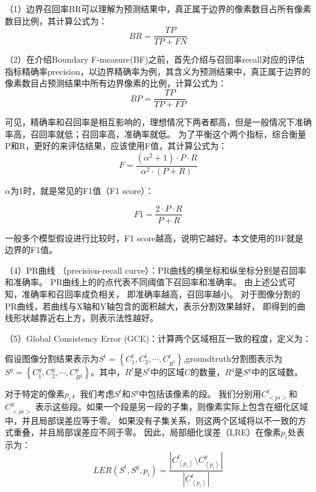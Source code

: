 （1）边界召回率BR可以理解为预测结果中，真正属于边界的像素数目占所有像素数目比例，其计算公式为：
\begin{equation}
BR = \frac{TP}{TP+FN}
\end{equation}

（2）在介绍Boundary F-measure(BF)之前，首先介绍与召回率recall对应的评估指标精确率precision，以边界精确率为例，其含义为预测结果中，真正属于边界的像素数目占预测结果中所有边界像素的比例，计算公式为：
\begin{equation}
BP = \frac{TP}{TP+FP}
\end{equation}

可见，精确率和召回率是相互影响的，理想情况下两者都高，但是一般情况下准确率高，召回率就低；召回率高，准确率就低。
为了平衡这个两个指标，综合衡量P和R，更好的来评估结果，应该使用F值，其计算公式为：
\begin{equation}
F=\frac{(\alpha^{2}+1)\cdot P\cdot R }{\alpha^{2}\cdot(P+R)}
\end{equation}

$\alpha$为1时，就是常见的F1值（F1 score）：

\begin{equation}
F1=\frac{2 \cdot P\cdot R }{P+R}
\end{equation}

一般多个模型假设进行比较时，F1 score越高，说明它越好。本文使用的BF就是边界的F1值。

（4）PR曲线 （precision-recall curve）：PR曲线的横坐标和纵坐标分别是召回率和准确率。
PR曲线上的的点代表不同阈值下召回率和准确率。
由上述公式可知，准确率和召回率成负相关， 即准确率越高，召回率越小。
对于图像分割的PR曲线，若曲线与X轴和Y轴包含的面积越大，表示分割效果越好，
即得到的曲线形状越靠近右上方，则表示法性越好。

（5）Global Consistency Error (GCE)：计算两个区域相互一致的程度，定义为：

假设图像分割结果表示为$S^{t} = \left \{ C_{1}^{t},C_{2}^{t},\cdots ,C_{R^{t}}^{t} \right \}$,groundtruth分割图表示为
$S^{g} = \left \{ C_{1}^{g},C_{2}^{g},\cdots ,C_{R^{g}}^{g} \right \}$。其中，$R^{t}$是$S^{t}$中的区域$C$的数量，$R^{g}$是$S^{g}$中的区域数。

对于特定的像素$p_{i}$，我们考虑$S^{t}$和$S^{g}$中包括该像素的段。 我们分别用$C_{<pi>}^{t}$和$C_{<pi>}^{g}$ 表示这些段。如果一个段是另一段的子集，则像素实际上包含在细化区域中，并且局部误差应等于零。 如果没有子集关系，则这两个区域将以不一致的方式重叠，并且局部误差应不同于零。 因此，局部细化误差（LRE）在像素$p_{i}$处表示为：
\begin{equation}
LER(S^{t},S^{g},p_{i}) = \frac{\left | C_{\left \langle p_{i}\right \rangle}^{t} \setminus
C_{\left \langle p_{i}\right \rangle}^{g}   \right |}{\left | C_{\left \langle p_{i}\right \rangle}^{t}\right |}
\end{equation}

